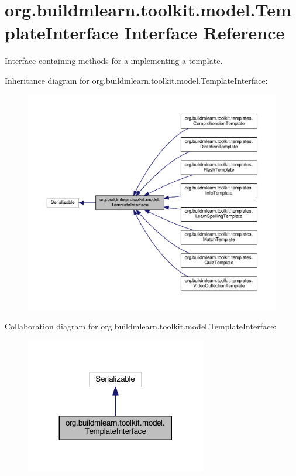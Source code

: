 \hypertarget{interfaceorg_1_1buildmlearn_1_1toolkit_1_1model_1_1TemplateInterface}{}\section{org.\+buildmlearn.\+toolkit.\+model.\+Template\+Interface Interface Reference}
\label{interfaceorg_1_1buildmlearn_1_1toolkit_1_1model_1_1TemplateInterface}


Interface containing methods for a implementing a template.  




Inheritance diagram for org.\+buildmlearn.\+toolkit.\+model.\+Template\+Interface\+:
\nopagebreak
\begin{figure}[H]
\begin{center}
\leavevmode
\includegraphics[width=350pt]{interfaceorg_1_1buildmlearn_1_1toolkit_1_1model_1_1TemplateInterface__inherit__graph}
\end{center}
\end{figure}


Collaboration diagram for org.\+buildmlearn.\+toolkit.\+model.\+Template\+Interface\+:
\nopagebreak
\begin{figure}[H]
\begin{center}
\leavevmode
\includegraphics[width=224pt]{interfaceorg_1_1buildmlearn_1_1toolkit_1_1model_1_1TemplateInterface__coll__graph}
\end{center}
\end{figure}
